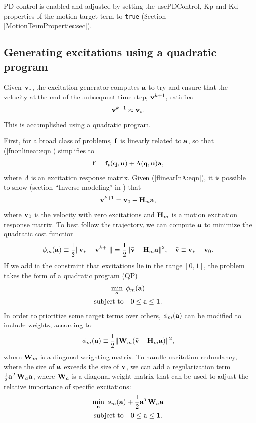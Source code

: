 PD control is enabled and adjusted by setting the {\sf usePDControl}, {\sf Kp}
and {\sf Kd} properties of the motion target term to {\tt true}
(Section \ref{MotionTermProperties:sec}).

\subsection{Generating excitations using a quadratic program}
\label{GeneratingExcitations:sec}

Given ${\bf v}_*$, the excitation generator computes ${\bf a}$ to try and ensure that the
velocity at the end of the subsequent time step, ${\bf v}^{k+1}$, satisfies
%
\begin{equation}
{\bf v}^{k+1} \approx {\bf v}_*.
\label{vtrack:eqn}
\end{equation}
%
This is accomplished using a quadratic program.

First, for a broad class of problems, ${\bf f}$ is linearly related to ${\bf a}$,
so that (\ref{fnonlinear:eqn}) simplifies to
%
\begin{equation}
{\bf f} = {\bf f}_p ({\bf q}, {\bf u}) + \Lambda ({\bf q}, {\bf u}) {\bf a},
\label{flinearInA:eqn}	
\end{equation}
where $\Lambda$ is an excitation response matrix. Given (\ref{flinearInA:eqn}),
it is possible to show (section ``Inverse modeling''
in \cite{lloyd2012artisynth}) that
%
\begin{equation*}
{\bf v}^{k+1} = {\bf v}_0 + {\bf H}_m {\bf a},
\end{equation*}
%
where ${\bf v}_0$ is the velocity with zero excitations and ${\bf H}_m$ is a
motion excitation response matrix. To best follow the trajectory, we
can compute ${\bf a}$ to minimize the quadratic cost function
%
\begin{equation}
\phi_m({\bf a}) \equiv \frac{1}{2} \| {\bf v}_* - {\bf v}^{k+1} \| = 
\frac{1}{2} \| \bar{{\bf v}} - {\bf H}_m {\bf a} \|^2, \quad
\bar{{\bf v}} \equiv {\bf v}_* - {\bf v}_0.
\label{MotionCostTerm:eqn}
\end{equation}
%
If we add in the constraint that excitations lie in the range $[0,
1]$, the problem takes the form of a quadratic program (QP)
%
\begin{gather}
\min_{{\bf a}} \; \phi_m({\bf a}) \notag \\
\text{subject to} \quad 0 \le {\bf a} \le {\bf 1}.
\label{basicQP:eqn}
\end{gather}
%
In order to prioritize some target terms over others,
$\phi_m({\bf a})$ can be modified to include weights, according to
%
\begin{equation}
\phi_m({\bf a}) \equiv \frac{1}{2} \| {\bf W}_m (\bar{{\bf v}} - {\bf H}_m {\bf a}) \|^2,
\label{motionCostTerm:eqn}	
\end{equation}
%
where ${\bf W}_m$ is a diagonal weighting matrix.
%
To handle excitation redundancy, where the size of ${\bf a}$ exceeds the
size of ${\bf v}$, we can add a regularization term
$\frac{1}{2} {\bf a}^T {\bf W}_a {\bf a}$, where ${\bf W}_a$ is a diagonal weight matrix that
can be used to adjust the relative importance of specific excitations:
%
\begin{gather}
\min_{{\bf a}} \; \phi_m({\bf a}) + \frac{1}{2} {\bf a}^T {\bf W}_a {\bf a} \notag \notag \\
\text{subject to} \quad 0 \le {\bf a} \le {\bf 1}.
\label{regularizedQP:eqn}
\end{gather}
%


